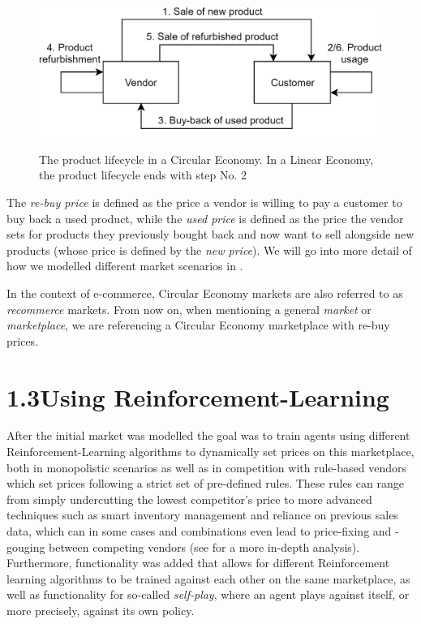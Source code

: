 \begin{figure}
	\centering
	\includegraphics[width = \textwidth]{images/product_lifecycle.png}\\[1 ex]
	\caption{The product lifecycle in a Circular Economy. In a Linear Economy, the product lifecycle ends with step No. 2}\label{fig:IntroMarketDynamics}
\end{figure}

The \emph{re-buy price} is defined as the price a vendor is willing to pay a customer to buy back a used product, while the \emph{used price} is defined as the price the vendor sets for products they previously bought back and now want to sell alongside new products (whose price is defined by the \emph{new price}). We will go into more detail of how we modelled different market scenarios in .

In the context of e-commerce, Circular Economy markets are also referred to as \emph{recommerce} markets. From now on, when mentioning a general \emph{market} or \emph{marketplace}, we are referencing a Circular Economy marketplace with re-buy prices.

\section*{1.3\space\space Using Reinforcement-Learning}\label{sec:ReinforcementLearningIntroduction}

After the initial market was modelled the goal was to train agents using different Reinforcement-Learning algorithms to dynamically set prices on this marketplace, both in monopolistic scenarios as well as in competition with rule-based vendors which set prices following a strict set of pre-defined rules. These rules can range from simply undercutting the lowest competitor's price to more advanced techniques such as smart inventory management and reliance on previous sales data, which can in some cases and combinations even lead to price-fixing and -gouging between competing vendors (see  for a more in-depth analysis). Furthermore, functionality was added that allows for different Reinforcement learning algorithms to be trained against each other on the same marketplace, as well as functionality for so-called \emph{self-play}, where an agent plays against itself, or more precisely, against its own policy.

